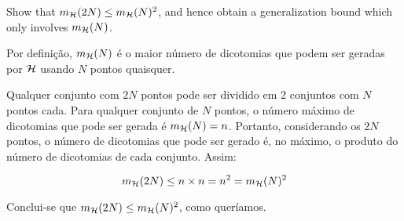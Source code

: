 \begin{enunciado}{10}
    Show that $m_{\mathcal{H}}(2N) \le m_{\mathcal{H}}(N)^2$, and hence obtain a generalization bound which only involves $m_{\mathcal{H}}(N)$.
\end{enunciado}

Por definição, $m_{\mathcal{H}}(N)$ é o maior número de dicotomias que podem ser geradas por $\mathcal{H}$ usando $N$ pontos quaisquer.

Qualquer conjunto com $2N$ pontos pode ser dividido em 2 conjuntos com $N$ pontos cada. Para qualquer conjunto de $N$ pontos,
o número máximo de dicotomias que pode ser gerada é $m_{\mathcal{H}}(N) = n$. Portanto, considerando os $2N$ pontos, o número de
dicotomias que pode ser gerado é, no máximo, o produto do número de dicotomias de cada conjunto. Assim:

\[
  m_{\mathcal{H}}(2N) \leq n \times n = n^2 = m_{\mathcal{H}}(N)^2
\]

Conclui-se que $m_{\mathcal{H}}(2N) \leq m_{\mathcal{H}}(N)^2$, como queríamos.
